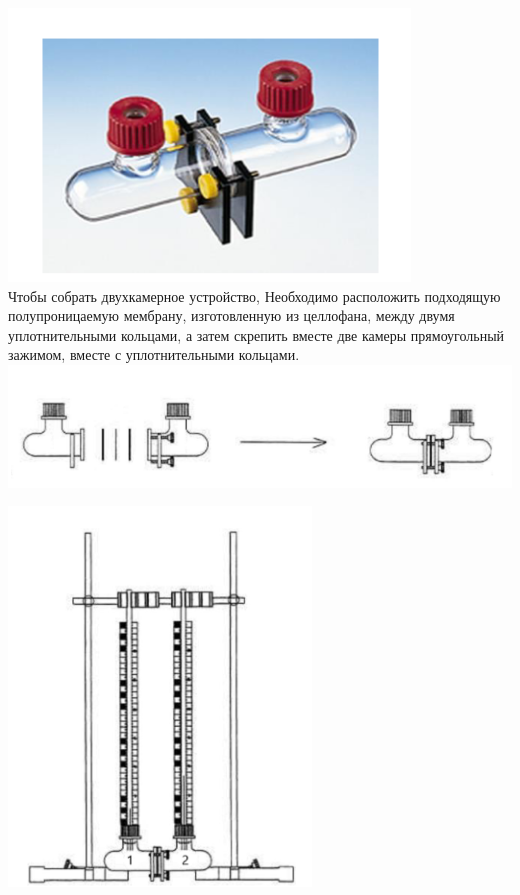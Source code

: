 \documentclass{article}
\begin{document}
            \includegraphics*[width=0.8\textwidth]{tools1.png} \\

            \hspace*{4mm}Чтобы собрать двухкамерное устройство,
            Необходимо расположить подходящую полупроницаемую мембрану,
            изготовленную из целлофана, между двумя уплотнительными кольцами, а затем
            скрепить вместе две камеры прямоугольный зажимом, вместе с
            уплотнительными кольцами. \\

            \includegraphics[scale=0.65]{tools2.png} \\

            \begin{center}
                \includegraphics[scale=0.8]{tools3.png}
                \vspace*{4mm}
            \end{center}
\end{document}

